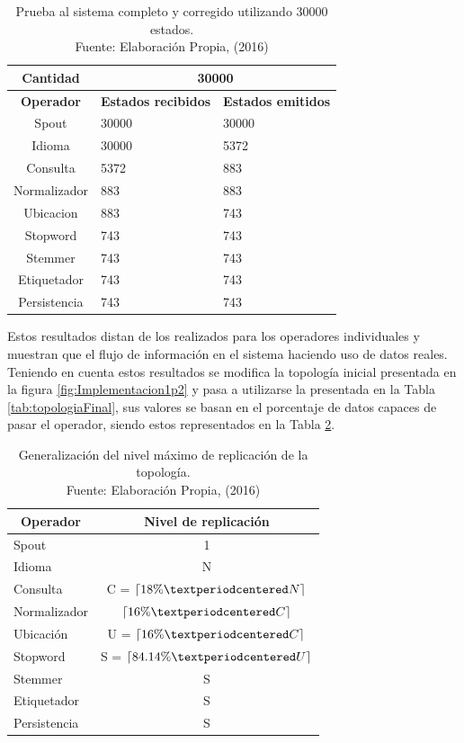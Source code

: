 \begin{table}[H]
\centering
\caption[Prueba al sistema completo y corregido utilizando 30000 estados.]{Prueba al sistema completo y corregido utilizando 30000 estados.\\Fuente: Elaboración Propia, (2016)}
\label{tab:sistemaCompletoEstadosCorregidos}
\begin{tabular}{|c|l|l|}
\hline
\textbf{Cantidad} & \multicolumn{2}{c|}{\textbf{30000}} \\ \hline
\textbf{Operador} & \multicolumn{1}{c|}{\textbf{Estados recibidos}} & \multicolumn{1}{c|}{\textbf{Estados emitidos}} \\ \hline
Spout & 30000 & 30000 \\ \hline
Idioma & 30000 & 5372 \\ \hline
Consulta & 5372 & 883 \\ \hline
Normalizador & 883 & 883 \\ \hline
Ubicacion & 883 & 743 \\ \hline
Stopword & 743 & 743 \\ \hline
Stemmer & 743 & 743 \\ \hline
Etiquetador & 743 & 743 \\ \hline
Persistencia & 743 & 743 \\ \hline
\end{tabular}
\end{table}

Estos resultados distan de los realizados para los operadores individuales y muestran que el flujo de información en el sistema haciendo uso de datos reales. Teniendo en cuenta estos resultados se modifica la topología inicial presentada en la figura \ref{fig:Implementacion1p2} y pasa a utilizarse la presentada en la Tabla \ref{tab:topologiaFinal}, sus valores se basan en el porcentaje de datos capaces de pasar el operador, siendo estos representados en la Tabla \ref{tab:topologiaFinal2}.

\begin{table}[H]
\centering
\caption[Generalización del nivel máximo de replicación de la topología.]{Generalización del nivel máximo de replicación de la topología.\\Fuente: Elaboración Propia, (2016)}
\label{tab:topologiaFinal2}
\begin{tabular}{|l|c|}
\hline
\multicolumn{1}{|c|}{\textbf{Operador}} & \textbf{Nivel de replicación} \\ \hline
Spout & 1 \\ \hline
Idioma & N \\ \hline
Consulta & C = $\ceil{18\% · N}$ \\ \hline
Normalizador & $\ceil{16\% · C}$ \\ \hline
Ubicación & U = $\ceil{16\% · C}$ \\ \hline
Stopword & S = $\ceil{84.14\% · U}$ \\ \hline
Stemmer & S \\ \hline
Etiquetador & S \\ \hline
Persistencia & S \\ \hline
\end{tabular}
\end{table}
        
